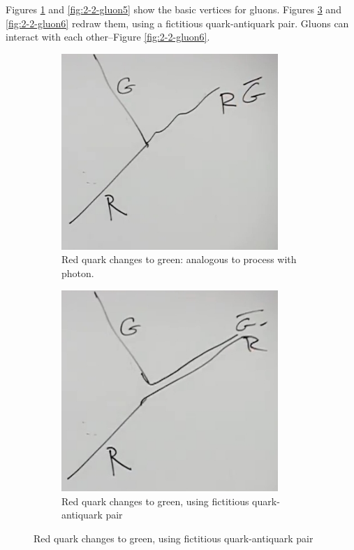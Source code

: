 \documentclass[]{article}
\begin{document}
Figures \ref{fig:2-2-gluon3} and \ref{fig:2-2-gluon5} show the basic vertices for gluons. Figures \ref{fig:2-2-gluon4} and \ref{fig:2-2-gluon6} redraw them, using a fictitious quark-antiquark pair. Gluons can interact with each other--Figure \ref{fig:2-2-gluon6}.
\begin{figure}[H]
	\caption{The basic vertices of QCD -- Quarks}
	\begin{subfigure}[t]{0.45\textwidth}
		\caption{Red quark changes to green: analogous to process with photon.}\label{fig:2-2-gluon3}
		\includegraphics[width=0.9\textwidth]{2-2-gluon3}
	\end{subfigure}
	\begin{subfigure}[t]{0.45\textwidth}
		\caption{Red quark changes to green, using fictitious quark-antiquark pair}
		\label{fig:2-2-gluon4}
		\includegraphics[width=0.9\textwidth]{2-2-gluon4}
	\end{subfigure}

\end{figure}
\end{document}
